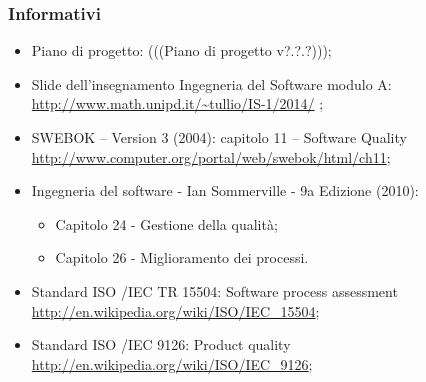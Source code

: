 \subsubsection{Informativi}
\begin{itemize}
\item Piano di progetto: (((Piano di progetto v?.?.?)));
\item Slide dell’insegnamento Ingegneria del Software modulo A:\\
\url{http://www.math.unipd.it/~tullio/IS-1/2014/} ;
\item SWEBOK – Version 3 (2004): capitolo 11 – Software Quality\\
\url{http://www.computer.org/portal/web/swebok/html/ch11};
\item Ingegneria del software - Ian Sommerville - 9a Edizione (2010):
\begin{itemize}
\item Capitolo 24 - Gestione della qualità;
\item Capitolo 26 - Miglioramento dei processi.
\end{itemize}
\item Standard ISO /IEC TR 15504: Software process assessment\\ \url{http://en.wikipedia.org/wiki/ISO/IEC_15504};
\item Standard ISO /IEC 9126: Product quality\\ \url{http://en.wikipedia.org/wiki/ISO/IEC_9126};
\end{itemize}
